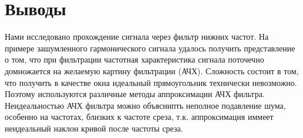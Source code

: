 \section{Выводы}

Нами исследовано прохождение сигнала через фильтр нижних частот. На примере зашумленного гармонического сигнала удалось получить представление о том, что при фильтрации частотная характеристика сигнала поточечно домножается на желаемую картину фильтрации (АЧХ). Сложность состоит в том, что получить в качестве окна идеальный прямоугольник технически невозможно. Поэтому используются различные методы аппроксимации АЧХ фильтра. Неидеальностью АЧХ фильтра можно объяснипть неполное подавление шума, особенно на частотах, близких к частоте среза, т.к. аппроксимация иммеет неидеальный наклон кривой после частоты среза.


